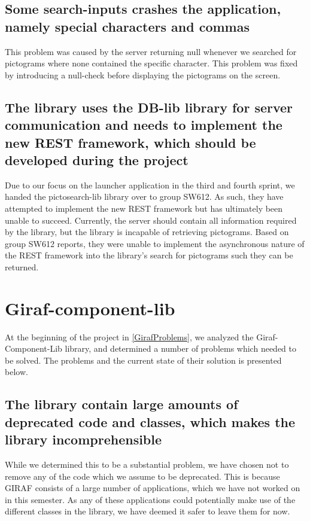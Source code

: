 \subsection*{Some search-inputs crashes the application, namely special
characters and commas}
This problem was caused by the server returning null whenever we searched for
pictograms where none contained the specific character. This problem was fixed
by introducing a null-check before displaying the pictograms on the screen.
  
  
\subsection*{The library uses the DB-lib library for server communication and
needs to implement the new REST framework, which should be developed during the
project}
Due to our focus on the launcher application in the third and fourth sprint, we
handed the pictosearch-lib library over to group SW612. As such, they have
attempted to implement the new REST framework but has ultimately been unable to
succeed. Currently, the server should contain all information required by the
library, but the library is incapable of retrieving pictograms. Based on group
SW612 reports, they were unable to implement the asynchronous nature of the REST
framework into the library's search for pictograms such they can be returned.

\section{Giraf-component-lib}
At the beginning of the project in \autoref{GirafProblems}, we analyzed the
Giraf-Component-Lib library, and determined a number of problems which needed to
be solved. The problems and the current state of their solution is presented
below.

\subsection*{The library contain large amounts of deprecated code and classes,
which makes the library incomprehensible}
While we determined this to be a substantial problem, we have chosen not to
remove any of the code which we assume to be deprecated. This is because GIRAF
consists of a large number of applications, which we have not worked on in this
semester. As any of these applications could potentially make use of the
different classes in the library, we have deemed it safer to leave them for now.

